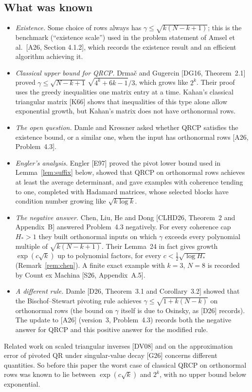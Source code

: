 \documentclass[11pt,a4paper]{article}
\theoremstyle{definition}
\numberwithin{equation}{section}
\begin{document}
\subsection{What was known}
\begin{itemize}
\item \emph{Existence.} Some choice of rows always has $\gamma\le\sqrt{k(N-k+1)}$; this is the benchmark
  (``existence scale'') used in the problem statement of Amsel et al.\ [A26, Section 4.1.2], which records the
  existence result and an efficient algorithm achieving it.
\item \emph{Classical upper bound for QRCP.} Drmač and Gugercin [DG16, Theorem~2.1] proved
  $\gamma\le\sqrt{N-k+1}\,\sqrt{4^k+6k-1}/3$, which grows like $2^k$. Their proof uses the greedy inequalities one
  matrix entry at a time. Kahan's classical triangular matrix [K66] shows that inequalities of this type alone allow
  exponential growth, but Kahan's matrix does not have orthonormal rows.
\item \emph{The open question.} Damle and Kressner asked whether QRCP satisfies the existence bound, or a similar
  one, when the input has orthonormal rows [A26, Problem~4.3].
\item \emph{Engler's analysis.} Engler [E97] proved the pivot lower bound used in Lemma~\ref{lem:suffix} below,
  showed that QRCP on orthonormal rows achieves at least the average determinant, and gave examples with coherence
  tending to one, completed with Hadamard matrices, whose selected blocks have condition number growing like
  $\sqrt{k\log k}$.
\item \emph{The negative answer.} Chen, Liu, He and Dong [CLHD26, Theorem~2 and Appendix~B] answered Problem~4.3
  negatively. For every coherence cap $H_*>1$ they built orthonormal inputs on which $\gamma$ exceeds every
  polynomial multiple of $\sqrt{k(N-k+1)}$. Their Lemma~24 in fact gives growth $\exp(c\sqrt k)$ up to polynomial
  factors, for every $c<\tfrac12\sqrt{\log H_*}$ (Remark~\ref{rem:chen}). A finite exact example with $k=3$, $N=8$
  is recorded by Count ex Machina [S26, Appendix~A.5].
\item \emph{A different rule.} Damle [D26, Theorem~3.1 and Corollary~3.2] showed that the Bischof--Stewart pivoting
  rule achieves $\gamma\le\sqrt{1+k(N-k)}$ on orthonormal rows (the bound on $\gamma$ itself is due to Osinsky,
  as [D26] records). The update to [A26] (version~3, Problem~4.3)
  records both the negative answer for QRCP and this positive answer for the modified rule.
\end{itemize}
Related work on scaled triangular inverses [DV08] and on the approximation error of pivoted QR under
singular-value decay [G26] concerns different quantities.
So before this paper the worst case of classical QRCP on orthonormal rows was known to lie between
$\exp(c\sqrt k)$ and $2^k$, with no upper bound below exponential.
\end{document}
